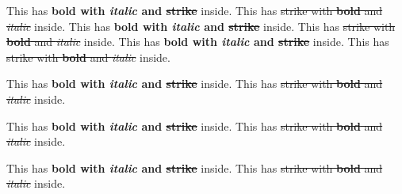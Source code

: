 This has \textbf{bold with \emph{italic} and \sout{strike}} inside.
This has \sout{strike with \textbf{bold} and \emph{italic}} inside.
This has \textbf{bold with \emph{italic} and \sout{strike}} inside.
This has \sout{strike with \textbf{bold} and \emph{italic}} inside.
This has \textbf{bold with \emph{italic} and \sout{strike}} inside.
This has \sout{strike with \textbf{bold} and \emph{italic}} inside.
\begin{frame}[t]
This has \textbf{bold with \emph{italic} and \sout{strike}} inside.
This has \sout{strike with \textbf{bold} and \emph{italic}} inside.
\end{frame}

\begin{frame}[t]
This has \textbf{bold with \emph{italic} and \sout{strike}} inside.
This has \sout{strike with \textbf{bold} and \emph{italic}} inside.
\end{frame}

\begin{frame}[t]
This has \textbf{bold with \emph{italic} and \sout{strike}} inside.
This has \sout{strike with \textbf{bold} and \emph{italic}} inside.
\end{frame}

